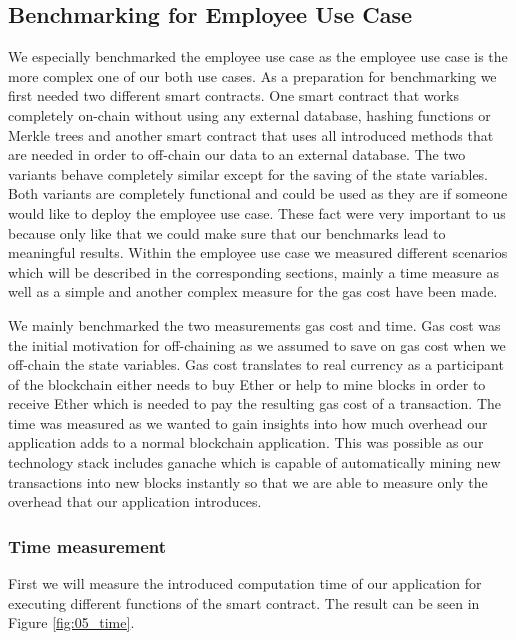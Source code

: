 \subsection{Benchmarking for Employee Use Case}
We especially benchmarked the employee use case as the employee use case is the more complex one of our both use cases.
As a preparation for benchmarking we first needed two different smart contracts.
One smart contract that works completely on-chain without using any external database, hashing functions or Merkle trees and another smart contract that uses all introduced methods that are needed in order to off-chain our data to an external database.
The two variants behave completely similar except for the saving of the state variables.
Both variants are completely functional and could be used as they are if someone would like to deploy the employee use case.
These fact were very important to us because only like that we could make sure that our benchmarks lead to meaningful results.
Within the employee use case we measured different scenarios which will be described in the corresponding sections, mainly a time measure as well as a simple and another complex measure for the gas cost have been made.

We mainly benchmarked the two measurements gas cost and time.
Gas cost was the initial motivation for off-chaining as we assumed to save on gas cost when we off-chain the state variables.
Gas cost translates to real currency as a participant of the blockchain either needs to buy Ether or help to mine blocks in order to receive Ether which is needed to pay the resulting gas cost of a transaction.
The time was measured as we wanted to gain insights into how much overhead our application adds to a normal blockchain application.
This was possible as our technology stack includes ganache which is capable of automatically mining new transactions into new blocks instantly so that we are able to measure only the overhead that our application introduces.

\subsubsection{Time measurement}
First we will measure the introduced computation time of our application for executing different functions of the smart contract.
The result can be seen in Figure \ref{fig:05_time}.

